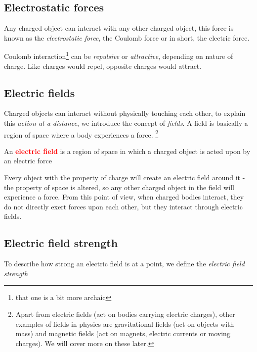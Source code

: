 \documentclass[a4paper,12pt]{book}
\newcounter{example}[chapter]
\newenvironment{ilight}
  {\centering
  	\vspace*{6pt}
  	\begin{tcolorbox}[colframe=Gray,colback=LightGrey!15]
  \setlength{\baselineskip}{\baselineskip}%
  }
  {\end{tcolorbox}\vspace*{-4pt}}
\newcommand{\keypoint}[1]{\textbf{\textcolor{red}{#1}}}
\newcommand{\keypoint}[1]{\textbf{\textcolor{red}{#1}}}
\begin{document}
\subsection{Electrostatic forces}

Any charged object can interact with any other charged object, this force is known as the \emph{electrostatic force}, the Coulomb force or in short, the electric force. 

Coulomb interaction\footnote{that one is a bit more archaic} can be \emph{repulsive} or \emph{attractive}, depending on nature of charge. Like charges would repel, opposite charges would attract.

\subsection{Electric fields}

Charged objects can interact without physically touching each other, to explain this \emph{action at a distance}, we introduce the concept of \emph{fields}. A field is basically a region of space where a body experiences a force.
\footnote{Apart from electric fields (act on bodies carrying electric charges), other examples of fields in physics are gravitational fields (act on objects with mass) and magnetic fields (act on magnets, electric currents or moving charges). We will cover more on these later.}

\begin{ilight}
	\centering An \keypoint{electric field} is a region of space in which a charged object is acted upon by an electric force
\end{ilight}

Every object with the property of charge will create an electric field around it - the property of space is altered, so any other charged object in the field will experience a force. From this point of view, when charged bodies interact, they do not directly exert forces upon each other, but they interact through electric fields.

\newpage

\subsection{Electric field strength}

To describe how strong an electric field is at a point, we define the \emph{electric field strength}
\end{document}
